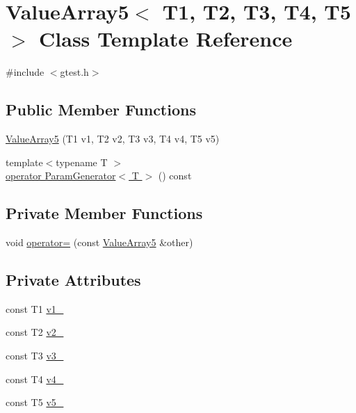 \hypertarget{classtesting_1_1internal_1_1ValueArray5}{\section{\-Value\-Array5$<$ \-T1, \-T2, \-T3, \-T4, \-T5 $>$ \-Class \-Template \-Reference}
\label{d0/d2e/classtesting_1_1internal_1_1ValueArray5}
}


{\ttfamily \#include $<$gtest.\-h$>$}

\subsection*{\-Public \-Member \-Functions}
\begin{DoxyCompactItemize}
\item 
\hyperlink{classtesting_1_1internal_1_1ValueArray5_a5db12a8a5e0254fc1691e730320aaf19}{\-Value\-Array5} (\-T1 v1, \-T2 v2, \-T3 v3, \-T4 v4, \-T5 v5)
\item 
{\footnotesize template$<$typename T $>$ }\\\hyperlink{classtesting_1_1internal_1_1ValueArray5_a08ef46fa12c9dd8ef6fc630baeea89b7}{operator Param\-Generator$<$ T $>$} () const 
\end{DoxyCompactItemize}
\subsection*{\-Private \-Member \-Functions}
\begin{DoxyCompactItemize}
\item 
void \hyperlink{classtesting_1_1internal_1_1ValueArray5_a41b34504b2d244f9a3dc377b64b77c15}{operator=} (const \hyperlink{classtesting_1_1internal_1_1ValueArray5}{\-Value\-Array5} \&other)
\end{DoxyCompactItemize}
\subsection*{\-Private \-Attributes}
\begin{DoxyCompactItemize}
\item 
const \-T1 \hyperlink{classtesting_1_1internal_1_1ValueArray5_aac1d0654cc6c1aceb4a5d0fa7a98042e}{v1\-\_\-}
\item 
const \-T2 \hyperlink{classtesting_1_1internal_1_1ValueArray5_a9f0a8ce6ce2fd27e980c4c51a7a7256a}{v2\-\_\-}
\item 
const \-T3 \hyperlink{classtesting_1_1internal_1_1ValueArray5_a4f8257321a2eab0456239174d6712d5e}{v3\-\_\-}
\item 
const \-T4 \hyperlink{classtesting_1_1internal_1_1ValueArray5_aac184059fee257381ccae81d8d112f85}{v4\-\_\-}
\item 
const \-T5 \hyperlink{classtesting_1_1internal_1_1ValueArray5_a1f3e0ada8419ed2e17cc61e6c0c54404}{v5\-\_\-}
\end{DoxyCompactItemize}


